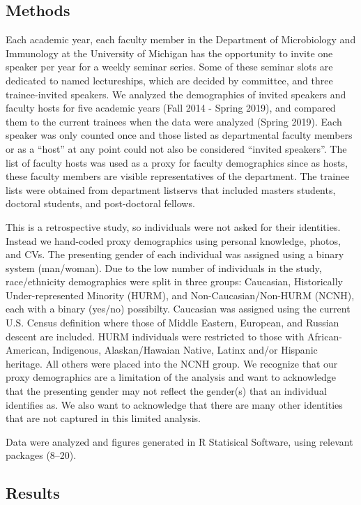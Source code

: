 \documentclass[10pt,]{article}
\begin{document}
\subsection{Methods}\label{methods}

Each academic year, each faculty member in the Department of
Microbiology and Immunology at the University of Michigan has the
opportunity to invite one speaker per year for a weekly seminar series.
Some of these seminar slots are dedicated to named lectureships, which
are decided by committee, and three trainee-invited speakers. We
analyzed the demographics of invited speakers and faculty hosts for five
academic years (Fall 2014 - Spring 2019), and compared them to the
current trainees when the data were analyzed (Spring 2019). Each speaker
was only counted once and those listed as departmental faculty members
or as a ``host'' at any point could not also be considered ``invited
speakers''. The list of faculty hosts was used as a proxy for faculty
demographics since as hosts, these faculty members are visible
representatives of the department. The trainee lists were obtained from
department listservs that included masters students, doctoral students,
and post-doctoral fellows.

This is a retrospective study, so individuals were not asked for their
identities. Instead we hand-coded proxy demographics using personal
knowledge, photos, and CVs. The presenting gender of each individual was
assigned using a binary system (man/woman). Due to the low number of
individuals in the study, race/ethnicity demographics were split in
three groups: Caucasian, Historically Under-represented Minority (HURM),
and Non-Caucasian/Non-HURM (NCNH), each with a binary (yes/no)
possibilty. Caucasian was assigned using the current U.S. Census
definition where those of Middle Eastern, European, and Russian descent
are included. HURM individuals were restricted to those with
African-American, Indigenous, Alaskan/Hawaian Native, Latinx and/or
Hispanic heritage. All others were placed into the NCNH group. We
recognize that our proxy demographics are a limitation of the analysis
and want to acknowledge that the presenting gender may not reflect the
gender(s) that an individual identifies as. We also want to acknowledge
that there are many other identities that are not captured in this
limited analysis.

Data were analyzed and figures generated in R Statisical Software, using
relevant packages (8--20).

\subsection{Results}\label{results}
\end{document}
